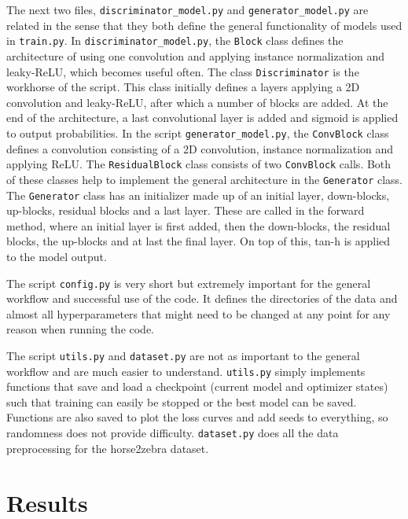 \documentclass[12pt, fleqn, titlepage]{article}
\begin{document}
The next two files, \texttt{discriminator\_model.py} and \texttt{generator\_model.py} are related in the sense that they both define the general functionality of models used in \texttt{train.py}. In \texttt{discriminator\_model.py}, the \texttt{Block} class defines the architecture of using one convolution and applying instance normalization and leaky-ReLU, which becomes useful often. The class \texttt{Discriminator} is the workhorse of the script. This class initially defines a layers applying a 2D convolution and leaky-ReLU, after which a number of blocks are added. At the end of the architecture, a last convolutional layer is added and sigmoid is applied to output probabilities. In the script \texttt{generator\_model.py}, the \texttt{ConvBlock} class defines a convolution consisting of a 2D convolution, instance normalization and applying ReLU. The \texttt{ResidualBlock} class consists of two \texttt{ConvBlock} calls. Both of these classes help to implement the general architecture in the \texttt{Generator} class. The \texttt{Generator} class has an initializer made up of an initial layer, down-blocks, up-blocks, residual blocks and a last layer. These are called in the forward method, where an initial layer is first added, then the down-blocks, the residual blocks, the up-blocks and at last the final layer. On top of this, tan-h is applied to the model output.

The script \texttt{config.py} is very short but extremely important for the general workflow and successful use of the code. It defines the directories of the data and almost all hyperparameters that might need to be changed at any point for any reason when running the code.

The script \texttt{utils.py} and \texttt{dataset.py} are not as important to the general workflow and are much easier to understand. \texttt{utils.py} simply implements functions that save and load a checkpoint (current model and optimizer states) such that training can easily be stopped or the best model can be saved. Functions are also saved to plot the loss curves and add seeds to everything, so randomness does not provide difficulty. \texttt{dataset.py} does all the data preprocessing for the horse2zebra dataset.

\section{Results}\label{results}
\end{document}
